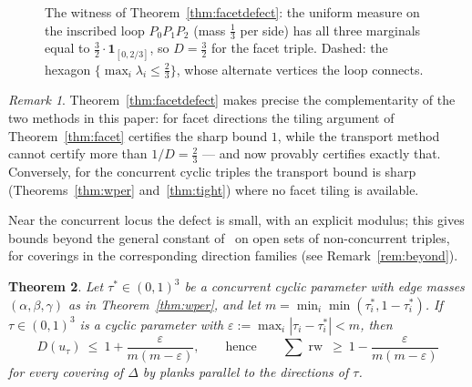 \documentclass[11pt,reqno]{amsart}
\theoremstyle{plain}
\newtheorem{theorem}{Theorem}[section]
\theoremstyle{definition}
\theoremstyle{remark}
\newtheorem{remark}[theorem]{Remark}
\newcommand{\rw}{\operatorname{rw}}
\begin{document}
\begin{figure}[ht]
\centering
{}
\caption{The witness of Theorem~\ref{thm:facetdefect}: the uniform measure on
the inscribed loop $P_0P_1P_2$ (mass $\tfrac13$ per side) has all three
marginals equal to $\tfrac32\cdot\mathbf1_{[0,2/3]}$, so $D=\tfrac32$ for the
facet triple. Dashed: the hexagon $\{\max_i\lambda_i\le\tfrac23\}$, whose
alternate vertices the loop connects.}
\label{fig:loop}
\end{figure}

\begin{remark}\label{rem:complement}
Theorem~\ref{thm:facetdefect} makes precise the complementarity of the two
methods in this paper: for facet directions the tiling argument of
Theorem~\ref{thm:facet} certifies the sharp bound $1$, while the transport
method cannot certify more than $1/D=\tfrac23$ --- and now provably certifies
exactly that. Conversely, for the concurrent cyclic triples the transport bound is
sharp (Theorems~\ref{thm:wper} and~\ref{thm:tight}) where no facet tiling is
available.
\end{remark}

Near the concurrent locus the defect is small, with an explicit modulus; this
gives bounds beyond the general constant of~\cite{BY26} on open sets of
non-concurrent triples, for coverings in the corresponding direction families
(see Remark~\ref{rem:beyond}).

\begin{theorem}\label{thm:defectstab}
Let $\tau^*\in(0,1)^3$ be a concurrent cyclic parameter with edge masses
$(\alpha,\beta,\gamma)$ as in Theorem~\ref{thm:wper}, and let
$m=\min_i\min(\tau_i^*,1-\tau_i^*)$. If $\tau\in(0,1)^3$ is a cyclic parameter
with $\varepsilon:=\max_i|\tau_i-\tau_i^*|<m$, then
\[
D(u_\tau)\ \le\ 1+\frac{\varepsilon}{m(m-\varepsilon)},
\qquad\text{hence}\qquad
\sum\rw\ \ge\ 1-\frac{\varepsilon}{m(m-\varepsilon)}
\]
for every covering of $\Delta$ by planks parallel to the directions of $\tau$.
\end{theorem}
\end{document}
